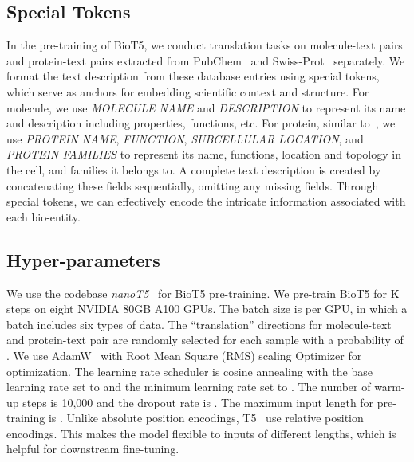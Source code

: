 \documentclass[11pt]{article}
\newcommand{\method}{{BioT5}}
\begin{document}
\subsection{Special Tokens}
\label{sec:special_tokens}
In the pre-training of \method{}, we conduct translation tasks on molecule-text pairs and protein-text pairs extracted from PubChem~\citep{kim2023pubchem} and Swiss-Prot~\citep{boutet2007uniprotkb} separately.
We format the text description from these database entries using special tokens, which serve as anchors for embedding scientific context and structure.
For molecule, we use \textit{MOLECULE NAME} and \textit{DESCRIPTION} to represent its name and description including properties, functions, etc.
For protein, similar to~\citet{xu2023protst}, we use \textit{PROTEIN NAME}, \textit{FUNCTION}, \textit{SUBCELLULAR LOCATION}, and \textit{PROTEIN FAMILIES} to represent its name, functions, location and topology in the cell, and families it belongs to.
A complete text description is created by concatenating these fields sequentially, omitting any missing fields.
Through special tokens, we can effectively encode the intricate information associated with each bio-entity.
\subsection{Hyper-parameters}
We use the codebase {\em nanoT5}~\citep{Nawrot_nanoT5_2023} for \method{} pre-training.
We pre-train \method{} for K steps on eight NVIDIA 80GB A100 GPUs.
The batch size is  per GPU, in which a batch includes six types of data.
The ``translation'' directions for molecule-text and protein-text pair are randomly selected for each sample with a probability of .
We use AdamW~\citep{DBLP:conf/iclr/LoshchilovH19} with Root Mean Square (RMS) scaling Optimizer for optimization.
The learning rate scheduler is cosine annealing with the base learning rate set to  and the minimum learning rate set to . 
The number of warm-up steps is 10,000 and the dropout rate is .
The maximum input length for pre-training is . 
Unlike absolute position encodings, T5~\citep{raffel2020exploring} use relative position encodings.
This makes the model flexible to inputs of different lengths, which is helpful for downstream fine-tuning.
\end{document}

